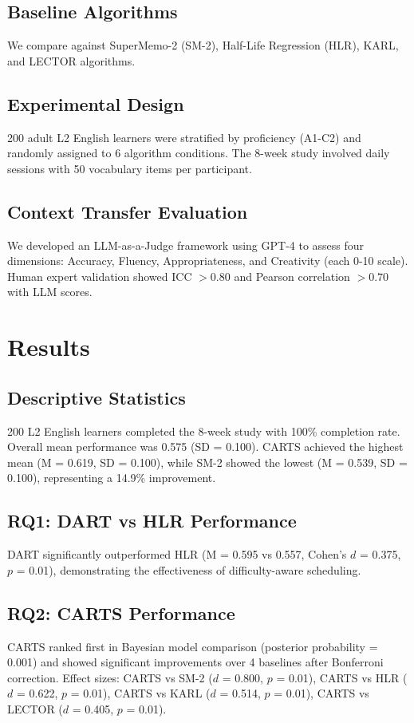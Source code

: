 \documentclass[11pt,a4paper]{article}
\begin{document}
\subsection{Baseline Algorithms}
We compare against SuperMemo-2 (SM-2), Half-Life Regression (HLR), KARL, and LECTOR algorithms.

\subsection{Experimental Design}
200 adult L2 English learners were stratified by proficiency (A1-C2) and randomly assigned to 6 algorithm conditions. The 8-week study involved daily sessions with 50 vocabulary items per participant.

\subsection{Context Transfer Evaluation}
We developed an LLM-as-a-Judge framework using GPT-4 to assess four dimensions: Accuracy, Fluency, Appropriateness, and Creativity (each 0-10 scale). Human expert validation showed ICC $> 0.80$ and Pearson correlation $> 0.70$ with LLM scores.

\section{Results}

\subsection{Descriptive Statistics}
200 L2 English learners completed the 8-week study with 100\% completion rate. Overall mean performance was 0.575 (SD = 0.100). CARTS achieved the highest mean (M = 0.619, SD = 0.100), while SM-2 showed the lowest (M = 0.539, SD = 0.100), representing a 14.9\% improvement.

\subsection{RQ1: DART vs HLR Performance}
DART significantly outperformed HLR (M = 0.595 vs 0.557, Cohen's $d$ = 0.375, $p$ = 0.01), demonstrating the effectiveness of difficulty-aware scheduling.

\subsection{RQ2: CARTS Performance}
CARTS ranked first in Bayesian model comparison (posterior probability = 0.001) and showed significant improvements over 4 baselines after Bonferroni correction. Effect sizes: CARTS vs SM-2 ($d$ = 0.800, $p$ = 0.01), CARTS vs HLR ($d$ = 0.622, $p$ = 0.01), CARTS vs KARL ($d$ = 0.514, $p$ = 0.01), CARTS vs LECTOR ($d$ = 0.405, $p$ = 0.01).
\end{document}
